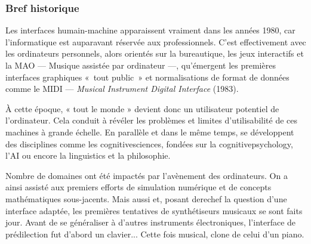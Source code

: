 \nopagebreak

\subsubsection[Bref historique]{Bref historique}
\label{subsub:I.3.1.1}

Les interfaces humain-machine apparaissent vraiment dans les années 1980, car l'informatique est auparavant réservée aux \pagebreak professionnels. %
C'est effectivement avec les ordinateurs personnels, alors orientés sur la bureautique, les jeux interactifs et la MAO --- Musique assistée par ordinateur ---, qu'émergent les premières interfaces graphiques «~tout public~» et normalisations de format de données comme le MIDI --- \textit{Musical Instrument Digital Interface} (1983).

À cette époque, « tout le monde » devient donc un utilisateur potentiel de l'ordinateur. Cela conduit à révéler les problèmes et limites d'utilisabilité de ces machines à grande échelle. En parallèle et dans le même temps, se développent des disciplines comme les \gls{cognitivesciences}, fondées sur la \gls{cognitivepsychology}, l'\gls{AI} ou encore la \gls{linguistics} et la philosophie.

Nombre de domaines ont été impactés par l'avènement des ordinateurs. On a ainsi assisté aux premiers efforts de simulation numérique et de concepts mathématiques sous-jacents.
Mais aussi et, posant derechef la question d'une interface adaptée, les premières tentatives de synthétiseurs musicaux se sont faits jour. Avant de se généraliser à d'autres instruments électroniques, l'interface de prédilection fut d'abord un clavier... Cette fois musical, clone de celui d'un piano.

